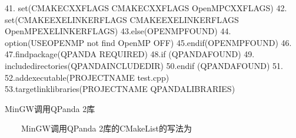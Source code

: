 \documentclass[a4paper,11pt,english]{sphinxmanual}
\begin{document}
\begin{sphinxVerbatim}[commandchars=\\\{\}]
41.    set(CMAKE\PYGZus{}CXX\PYGZus{}FLAGS \PYGZdq{}\PYGZdl{}\PYGZob{}CMAKE\PYGZus{}CXX\PYGZus{}FLAGS\PYGZcb{} \PYGZdl{}\PYGZob{}OpenMP\PYGZus{}CXX\PYGZus{}FLAGS\PYGZcb{}\PYGZdq{})
42.    set(CMAKE\PYGZus{}EXE\PYGZus{}LINKER\PYGZus{}FLAGS \PYGZdq{}\PYGZdl{}\PYGZob{}CMAKE\PYGZus{}EXE\PYGZus{}LINKER\PYGZus{}FLAGS\PYGZcb{} \PYGZdl{}\PYGZob{}OpenMP\PYGZus{}EXE\PYGZus{}LINKER\PYGZus{}FLAGS\PYGZcb{}\PYGZdq{})
43.else(OPENMP\PYGZus{}FOUND)
44.    option(USE\PYGZus{}OPENMP \PYGZdq{}not find OpenMP\PYGZdq{} OFF)
45.endif(OPENMP\PYGZus{}FOUND)
46.
47.find\PYGZus{}package(QPANDA REQUIRED)
48.if (QPANDA\PYGZus{}FOUND)
49.    include\PYGZus{}directories(\PYGZdl{}\PYGZob{}QPANDA\PYGZus{}INCLUDE\PYGZus{}DIR\PYGZcb{})
50.endif (QPANDA\PYGZus{}FOUND)
51.
52.add\PYGZus{}executable(\PYGZdl{}\PYGZob{}PROJECT\PYGZus{}NAME\PYGZcb{} test.cpp)
53.target\PYGZus{}link\PYGZus{}libraries(\PYGZdl{}\PYGZob{}PROJECT\PYGZus{}NAME\PYGZcb{} \PYGZdl{}\PYGZob{}QPANDA\PYGZus{}LIBRARIES\PYGZcb{})
\end{sphinxVerbatim}

\sphinxAtStartPar
​MinGW调用QPanda 2库

\sphinxAtStartPar
​  MinGW调用QPanda 2库的CMakeList的写法为
\end{document}
